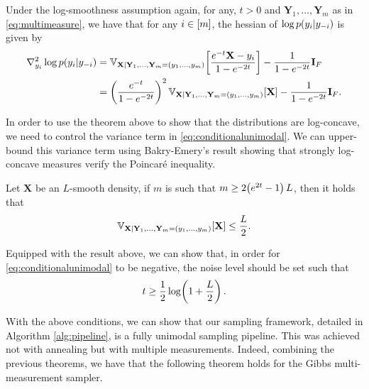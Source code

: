 \begin{theorem}
\label{thm:unimodality_conditional}
    Under the log-smoothness assumption again, for any, $t>0$ and $\mathbf{Y}_1, \dots, \mathbf{Y}_m$ as in \eqref{eq:multimeasure}, we have that for any  $i \in \mathopen{}\left[m\right]$, the hessian of $\log p\mathopen{}\left(y_i|y_{-i}\right)$ is given by
    \begin{align}
    \begin{split}
    \nabla^2_{y_i} \log p\mathopen{}\left(y_i|y_{-i}\right) &= \mathbb{V}_{\mathbf{X}|\mathbf{Y}_1, \dots, \mathbf{Y}_m = (y_1, \dots, y_m)}\mathopen{}\left[\frac{e^{-t} \mathbf{X} - y_i}{1 - e^{-2t}}\right] - \frac{1}{1-e^{-2t}}\mathbf{I}_F \\
    &= \mathopen{}\left(\frac{e^{-t}}{1 - e^{-2t}}\right)^2\mathbb{V}_{\mathbf{X}|\mathbf{Y}_1, \dots, \mathbf{Y}_m =(y_1, \dots, y_m)}\mathopen{}\left[\mathbf{X}\right] - \frac{1}{1-e^{-2t}}\mathbf{I}_F.
    \end{split}
    \end{align}
    \label{eq:conditionalunimodal}
\end{theorem}
In order to use the theorem above to show that the distributions are log-concave, we need to control the variance term in \eqref{eq:conditionalunimodal}. We can upper-bound this variance term using Bakry-Emery's result showing that strongly log-concave measures verify the Poincaré inequality.

\begin{theorem}
\label{thm:variance}
    Let $\mathbf{X}$ be an $L$-smooth density, if $m$ is such that $m \geq 2\mathopen{}\left(e^{2t} - 1\right)L$, then it holds that
    \begin{equation}
       \mathbb{V}_{\mathbf{X}|\mathbf{Y}_1, \dots, \mathbf{Y}_m =(y_1, \dots, y_m)}\mathopen{}\left[\mathbf{X}\right] \leq \frac{L}{2}.
    \end{equation}
\end{theorem}

Equipped with the result above, we can show that, in order for \eqref{eq:conditionalunimodal} to be negative, the noise level should be set such that
\begin{equation}
t \geq \frac{1}{2}\log\mathopen{}\left(1 + \frac{L}{2}\right).
\end{equation}

With the above conditions, we can show that our sampling framework, detailed in Algorithm \ref{alg:pipeline}, is a fully unimodal sampling pipeline. This was achieved not with annealing but with multiple measurements. Indeed, combining the previous theorems, we have that the following theorem holds for the Gibbs multi-measurement sampler.

